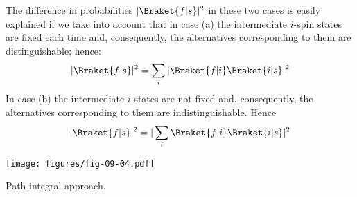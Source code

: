 \documentclass[a4paper,sfsidenotes,colorlinks=true]{tufte-book}
\numberwithin{equation}{section}
\numberwithin{figure}{section}
\begin{document}
The difference in probabilities $| \Braket{f | s} |^{2}$ in these two cases
is easily explained if we take into account that in case (a) the
intermediate $i$-spin states are fixed each time and, consequently, the
alternatives corresponding to them are distinguishable; hence:
\begin{equation}%
|\Braket{f|s}|^{2} = \sum_{i}|\Braket{f|i}\Braket{i|s}|^{2}
\label{eq-9.38}
\end{equation}
In case (b) the intermediate $i$-states are not fixed and, consequently, the alternatives corresponding to them are indistinguishable. Hence
\begin{equation}%
|\Braket{f|s}|^{2} = | \sum_{i} \Braket{f|i}\Braket{i|s}|^{2}
\label{eq-9.39}
\end{equation}

\begin{marginfigure}[3cm]
\centering
\texttt{[image: figures/fig-09-04.pdf]}
\caption{Path integral approach.}
\label{fig-9.4}
\end{marginfigure}
\end{document}
